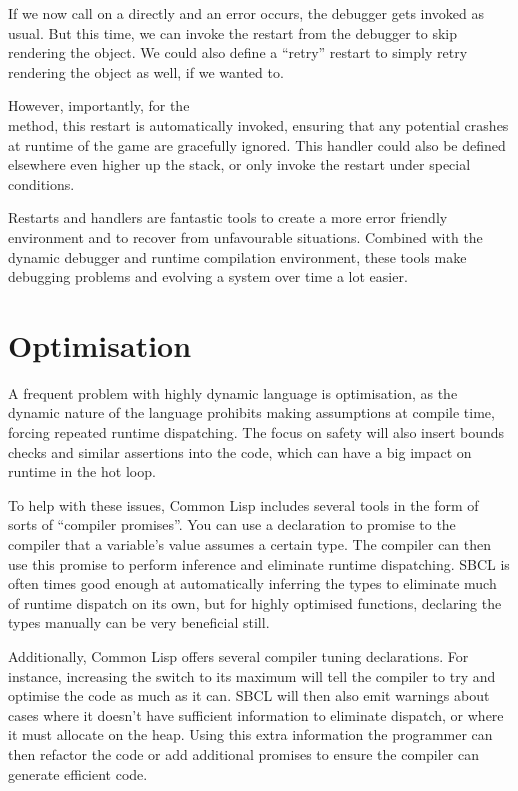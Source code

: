 \documentclass[a4paper]{paper}
\begin{document}
If we now call  on a  directly and an error occurs, the debugger gets invoked as usual. But this time, we can invoke the  restart from the debugger to skip rendering the object. We could also define a ``retry'' restart to simply retry rendering the object as well, if we wanted to.

However, importantly, for the  \\ method, this restart is automatically invoked, ensuring that any potential crashes at runtime of the game are gracefully ignored. This handler could also be defined elsewhere even higher up the stack, or only invoke the restart under special conditions.

Restarts and handlers are fantastic tools to create a more error friendly environment and to recover from unfavourable situations. Combined with the dynamic debugger and runtime compilation environment, these tools make debugging problems and evolving a system over time a lot easier.

\section{Optimisation}
A frequent problem with highly dynamic language is optimisation, as the dynamic nature of the language prohibits making assumptions at compile time, forcing repeated runtime dispatching. The focus on safety will also insert bounds checks and similar assertions into the code, which can have a big impact on runtime in the hot loop.

To help with these issues, Common Lisp includes several tools in the form of sorts of ``compiler promises''. You can use a declaration to promise to the compiler that a variable's value assumes a certain type. The compiler can then use this promise to perform inference and eliminate runtime dispatching. SBCL is often times good enough at automatically inferring the types to eliminate much of runtime dispatch on its own, but for highly optimised functions, declaring the types manually can be very beneficial still.

Additionally, Common Lisp offers several compiler tuning declarations. For instance, increasing the  switch to its maximum will tell the compiler to try and optimise the code as much as it can. SBCL will then also emit warnings about cases where it doesn't have sufficient information to eliminate dispatch, or where it must allocate on the heap. Using this extra information the programmer can then refactor the code or add additional promises to ensure the compiler can generate efficient code.
\end{document}
